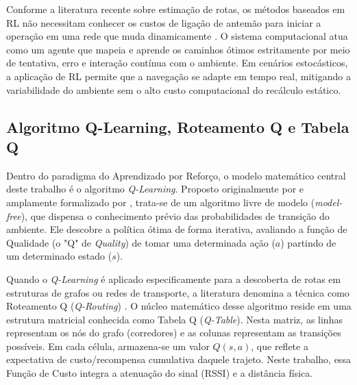 \documentclass[
    12pt,                %
    openright,           %
    oneside,             %
    a4paper,             %
    english,             %
    brazil               %
]{abntex2}
\begin{document}
Conforme a literatura recente sobre estimação de rotas, os métodos baseados em RL não necessitam conhecer os custos de ligação de antemão para iniciar a operação em uma rede que muda dinamicamente \cite{Pham2025}. O sistema computacional atua como um agente que mapeia e aprende os caminhos ótimos estritamente por meio de tentativa, erro e interação contínua com o ambiente. Em cenários estocásticos, a aplicação de RL permite que a navegação se adapte em tempo real, mitigando a variabilidade do ambiente sem o alto custo computacional do recálculo estático.

\subsection{Algoritmo Q-Learning, Roteamento Q e Tabela Q}

Dentro do paradigma do Aprendizado por Reforço, o modelo matemático central deste trabalho é o algoritmo \textit{Q-Learning}. Proposto originalmente por  e amplamente formalizado por , trata-se de um algoritmo livre de modelo (\textit{model-free}), que dispensa o conhecimento prévio das probabilidades de transição do ambiente. Ele descobre a política ótima de forma iterativa, avaliando a função de Qualidade (o "Q" de \textit{Quality}) de tomar uma determinada ação ($a$) partindo de um determinado estado ($s$).

Quando o \textit{Q-Learning} é aplicado especificamente para a descoberta de rotas em estruturas de grafos ou redes de transporte, a literatura denomina a técnica como Roteamento Q (\textit{Q-Routing}) \cite{BoyanLittman1994}. O núcleo matemático desse algoritmo reside em uma estrutura matricial conhecida como Tabela Q (\textit{Q-Table}). Nesta matriz, as linhas representam os nós do grafo (corredores) e as colunas representam as transições possíveis. Em cada célula, armazena-se um valor $Q(s, a)$, que reflete a expectativa de custo/recompensa cumulativa daquele trajeto. Neste trabalho, essa Função de Custo integra a atenuação do sinal (RSSI) e a distância física.
\end{document}
